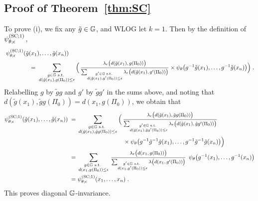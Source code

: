 \subsection{Proof of Theorem~\ref{thm:SC}}

To prove (i), we fix any $\tilde g \in \mathbb{G}$, and WLOG let $k=1$. Then by the definition of $\psi^{({\rm SC};1)}_{\theta;\epsilon}$,
\begin{align*}
    &\; \psiSCone_{\theta;\epsilon}
    (\tilde g(x_1), \ldots, \tilde g(x_n)) 
    \\
    & \hspace{4em} 
    \;=\;  
    \sum_{\substack{g \in \G \text{ s.t. } \\ d(\tilde g(x_1), g(\Pi_0)) \leq \epsilon}} 
    \Big(
    \, 
    \mfrac{ \lambda_\epsilon\big( d(\tilde g(x_1), g(\Pi_0)) \big) }{\sum_{\substack{g' \in \G \text{ s.t. } \\ d(\tilde g(x_1), g'(\Pi_0)) \leq \epsilon }}  \lambda_\epsilon\big( d(\tilde g(x_1), g'(\Pi_0)) \big)  }
    \times 
        \psi_\theta\big( g^{-1} \tilde g(x_1), \ldots, g^{-1} \tilde g(x_n) \big)
    \Big)\;.
\end{align*}
Relabelling $g$ by $\tilde g g$ and $g'$ by $\tilde g g'$ in the sums above, and noting that $d(\tilde g(x_1), \tilde g g(\Pi_0)) = d(x_1, g(\Pi_0))$, we obtain that 
\begin{align*}
    \psiSCone_{\theta;\epsilon}
    (\tilde g(x_1), \ldots, \tilde g(x_n)) 
    \;=&\;
    \sum_{\substack{g \in \G \text{ s.t. } \\ d(\tilde g(x_1), \tilde g g(\Pi_0)) \leq \epsilon}} 
    \Big(
    \, 
    \mfrac{ \lambda_\epsilon\big( d(\tilde g(x_1), \tilde g g(\Pi_0)) \big) }{\sum_{\substack{g' \in \G \text{ s.t. } \\ d(\tilde g(x_1),  \tilde g g'(\Pi_0)) \leq \epsilon}}  \lambda_\epsilon\big( d(\tilde g(x_1), \tilde g g'(\Pi_0)) \big)  }
    \,
    \\ 
    &\hspace{8em}
    \times 
        \psi_\theta\big( g^{-1} \tilde g^{-1} \tilde g(x_1), \ldots, g^{-1} \tilde g^{-1} \tilde g(x_n) \big)
    \Big)
    \\
    \;=&\;
    \sum_{\substack{g \in \G \text{ s.t. } \\ d(x_1, g(\Pi_0)) \leq \epsilon}} 
    \, 
    \mfrac{ \lambda_\epsilon\big(  d(x_1, g(\Pi_0)) \big) }{\sum_{\substack{g' \in \G \text{ s.t. } \\ d(x_1,  g'(\Pi_0)) \leq \epsilon}}  \lambda\big(  d(x_1,  g'(\Pi_0))\big)  }
    \,\;
    \psi_\theta\big( g^{-1} (x_1), \ldots, g^{-1} (x_n) \big)
    \\
    \;=&\;
    \psiSCone_{\theta;\epsilon}
    (x_1, \ldots, x_n)
    \;.
\end{align*}
This proves diagonal $\mathbb{G}$-invariance. 

